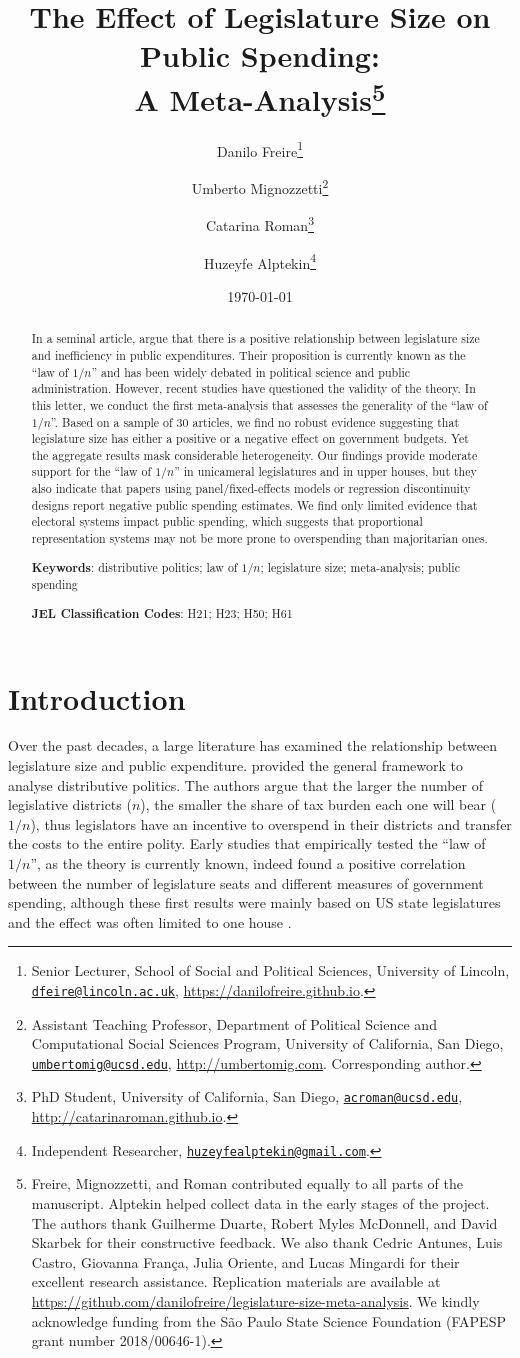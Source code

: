 \documentclass[11pt,a4paper,]{article}
\title{The Effect of Legislature Size on Public Spending:\\
A Meta-Analysis\thanks{Freire, Mignozzetti, and Roman contributed
equally to all parts of the manuscript. Alptekin helped collect data in
the early stages of the project. The authors thank Guilherme Duarte,
Robert Myles McDonnell, and David Skarbek for their constructive
feedback. We also thank Cedric Antunes, Luis Castro, Giovanna França,
Julia Oriente, and Lucas Mingardi for their excellent research
assistance. Replication materials are available at
\url{https://github.com/danilofreire/legislature-size-meta-analysis}. We
kindly acknowledge funding from the São Paulo State Science Foundation
(FAPESP grant number 2018/00646-1).}}
\author{Danilo Freire\footnote{Senior Lecturer, School of Social and
  Political Sciences, University of Lincoln,
  \href{mailto:dfeire@lincoln.ac.uk}{\nolinkurl{dfeire@lincoln.ac.uk}},
  \url{https://danilofreire.github.io}.} \and Umberto
Mignozzetti\footnote{Assistant Teaching Professor, Department of
  Political Science and Computational Social Sciences Program,
  University of California, San Diego,
  \href{mailto:umbertomig@ucsd.edu}{\nolinkurl{umbertomig@ucsd.edu}},
  \url{http://umbertomig.com}. Corresponding author.} \and Catarina
Roman\footnote{PhD Student, University of California, San Diego,
  \href{mailto:acroman@ucsd.edu}{\nolinkurl{acroman@ucsd.edu}},
  \url{http://catarinaroman.github.io}.} \and Huzeyfe
Alptekin\footnote{Independent Researcher,
  \href{mailto:huzeyfealptekin@gmail.com}{\nolinkurl{huzeyfealptekin@gmail.com}}.}}
\date{\today}
\begin{document}
\maketitle

\begin{abstract}
\doublespacing \noindent In a seminal article,
\citet{weingast1981political} argue that there is a positive
relationship between legislature size and inefficiency in public
expenditures. Their proposition is currently known as the ``law of
\(1/n\)'' and has been widely debated in political science and public
administration. However, recent studies have questioned the validity of
the theory. In this letter, we conduct the first meta-analysis that
assesses the generality of the ``law of \(1/n\)''. Based on a sample of
30 articles, we find no robust evidence suggesting that legislature size
has either a positive or a negative effect on government budgets. Yet
the aggregate results mask considerable heterogeneity. Our findings
provide moderate support for the ``law of \(1/n\)'' in unicameral
legislatures and in upper houses, but they also indicate that papers
using panel/fixed-effects models or regression discontinuity designs
report negative public spending estimates. We find only limited evidence
that electoral systems impact public spending, which suggests that
proportional representation systems may not be more prone to
overspending than majoritarian ones.
\vspace{.25cm}

\noindent \textbf{Keywords}: distributive politics; law of \(1/n\);
legislature size; meta-analysis; public spending
\vspace{.25cm}

\noindent \textbf{JEL Classification Codes}: H21; H23; H50; H61
\end{abstract}


\newpage

\hypertarget{introduction}{%
\section{Introduction}\label{introduction}}

\label{sec:intro}

Over the past decades, a large literature has examined the relationship
between legislature size and public expenditure.
\citet{weingast1981political} provided the general framework to analyse
distributive politics. The authors argue that the larger the number of
legislative districts (\(n\)), the smaller the share of tax burden each
one will bear (\(1/n\)), thus legislators have an incentive to overspend
in their districts and transfer the costs to the entire polity. Early
studies that empirically tested the ``law of \(1/n\)'', as the theory is
currently known, indeed found a positive correlation between the number
of legislature seats and different measures of government spending,
although these first results were mainly based on US state legislatures
and the effect was often limited to one house
\citep[e.g.,][]{baqir2002districting, gilligan1995deviations, gilligan2001fiscal}.
\end{document}

